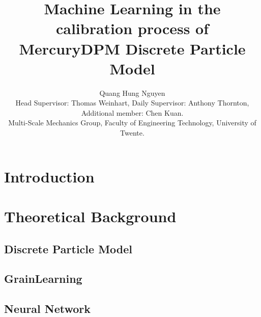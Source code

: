 \documentclass{article}
\title{Machine Learning in the calibration process of MercuryDPM Discrete Particle Model}
\author{Quang Hung Nguyen\\[1ex] \small Head Supervisor: Thomas Weinhart, Daily Supervisor: Anthony Thornton, Additional member: Chen Kuan. \\
\small Multi-Scale Mechanics Group, Faculty of Engineering Technology, University of Twente.}
\date{}
\begin{document}
\maketitle

\section{Introduction}




% 

\pagebreak

% 



\section{Theoretical Background}

\subsection{Discrete Particle Model} 



\subsection{GrainLearning}

\subsection{Neural Network}



\pagebreak


\end{document}
